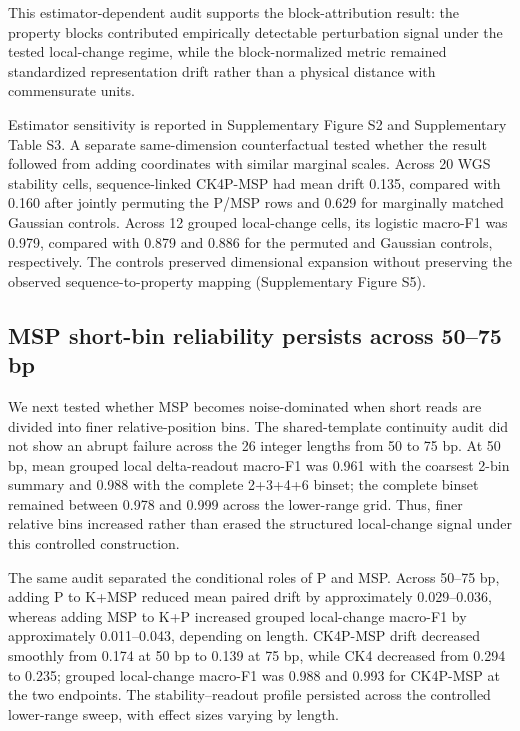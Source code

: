 This estimator-dependent audit supports the block-attribution result: the property blocks contributed empirically detectable perturbation signal under the tested local-change regime, while the block-normalized metric remained standardized representation drift rather than a physical distance with commensurate units.

Estimator sensitivity is reported in Supplementary Figure S2 and Supplementary Table S3. A separate same-dimension counterfactual tested whether the result followed from adding coordinates with similar marginal scales. Across 20 WGS stability cells, sequence-linked CK4P-MSP had mean drift 0.135, compared with 0.160 after jointly permuting the P/MSP rows and 0.629 for marginally matched Gaussian controls. Across 12 grouped local-change cells, its logistic macro-F1 was 0.979, compared with 0.879 and 0.886 for the permuted and Gaussian controls, respectively. The controls preserved dimensional expansion without preserving the observed sequence-to-property mapping (Supplementary Figure S5).

\subsection{MSP short-bin reliability persists across 50--75 bp}

We next tested whether MSP becomes noise-dominated when short reads are divided into finer relative-position bins. The shared-template continuity audit did not show an abrupt failure across the 26 integer lengths from 50 to 75 bp. At 50 bp, mean grouped local delta-readout macro-F1 was 0.961 with the coarsest 2-bin summary and 0.988 with the complete 2+3+4+6 binset; the complete binset remained between 0.978 and 0.999 across the lower-range grid. Thus, finer relative bins increased rather than erased the structured local-change signal under this controlled construction.

The same audit separated the conditional roles of P and MSP. Across 50--75 bp, adding P to K+MSP reduced mean paired drift by approximately 0.029--0.036, whereas adding MSP to K+P increased grouped local-change macro-F1 by approximately 0.011--0.043, depending on length. CK4P-MSP drift decreased smoothly from 0.174 at 50 bp to 0.139 at 75 bp, while CK4 decreased from 0.294 to 0.235; grouped local-change macro-F1 was 0.988 and 0.993 for CK4P-MSP at the two endpoints. The stability--readout profile persisted across the controlled lower-range sweep, with effect sizes varying by length.

